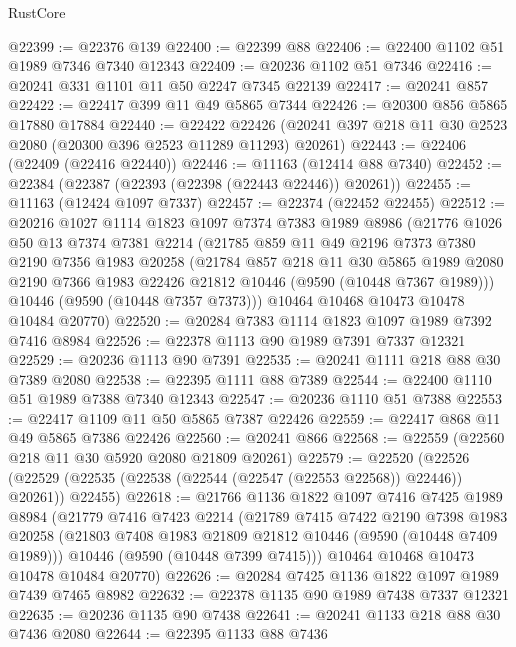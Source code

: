 \begin{lexlean}{RustCore}
\begin{coremodule}
@22399 := @22376 @139
@22400 := @22399 @88
@22406 := @22400 @1102 @51 @1989 @7346 @7340 @12343
@22409 := @20236 @1102 @51 @7346
@22416 := @20241 @331 @1101 @11 @50 @2247 @7345 @22139
@22417 := @20241 @857
@22422 := @22417 @399 @11 @49 @5865 @7344
@22426 := @20300 @856 @5865 @17880 @17884
@22440 := @22422
    @22426
    (@20241 @397 @218 @11 @30 @2523 @2080 (@20300 @396 @2523 @11289 @11293) @20261)
@22443 := @22406 (@22409 (@22416 @22440))
@22446 := @11163 (@12414 @88 @7340)
@22452 := @22384 (@22387 (@22393 (@22398 (@22443 @22446)) @20261))
@22455 := @11163 (@12424 @1097 @7337)
@22457 := @22374 (@22452 @22455)
@22512 := @20216
    @1027
    @1114
    @1823
    @1097
    @7374
    @7383
    @1989
    @8986
    (@21776
      @1026
      @50
      @13
      @7374
      @7381
      @2214
      (@21785
        @859
        @11
        @49
        @2196
        @7373
        @7380
        @2190
        @7356
        @1983
        @20258
        (@21784
          @857
          @218
          @11
          @30
          @5865
          @1989
          @2080
          @2190
          @7366
          @1983
          @22426
          @21812
          @10446
          (@9590 (@10448 @7367 @1989)))
        @10446
        (@9590 (@10448 @7357 @7373)))
      @10464
      @10468
      @10473
      @10478
      @10484
      @20770)
@22520 := @20284 @7383 @1114 @1823 @1097 @1989 @7392 @7416 @8984
@22526 := @22378 @1113 @90 @1989 @7391 @7337 @12321
@22529 := @20236 @1113 @90 @7391
@22535 := @20241 @1111 @218 @88 @30 @7389 @2080
@22538 := @22395 @1111 @88 @7389
@22544 := @22400 @1110 @51 @1989 @7388 @7340 @12343
@22547 := @20236 @1110 @51 @7388
@22553 := @22417 @1109 @11 @50 @5865 @7387 @22426
@22559 := @22417 @868 @11 @49 @5865 @7386 @22426
@22560 := @20241 @866
@22568 := @22559 (@22560 @218 @11 @30 @5920 @2080 @21809 @20261)
@22579 := @22520
    (@22526 (@22529 (@22535 (@22538 (@22544 (@22547 (@22553 @22568)) @22446)) @20261)) @22455)
@22618 := @21766
    @1136
    @1822
    @1097
    @7416
    @7425
    @1989
    @8984
    (@21779
      @7416
      @7423
      @2214
      (@21789
        @7415
        @7422
        @2190
        @7398
        @1983
        @20258
        (@21803 @7408 @1983 @21809 @21812 @10446 (@9590 (@10448 @7409 @1989)))
        @10446
        (@9590 (@10448 @7399 @7415)))
      @10464
      @10468
      @10473
      @10478
      @10484
      @20770)
@22626 := @20284 @7425 @1136 @1822 @1097 @1989 @7439 @7465 @8982
@22632 := @22378 @1135 @90 @1989 @7438 @7337 @12321
@22635 := @20236 @1135 @90 @7438
@22641 := @20241 @1133 @218 @88 @30 @7436 @2080
@22644 := @22395 @1133 @88 @7436

\end{coremodule}
\end{lexlean}
